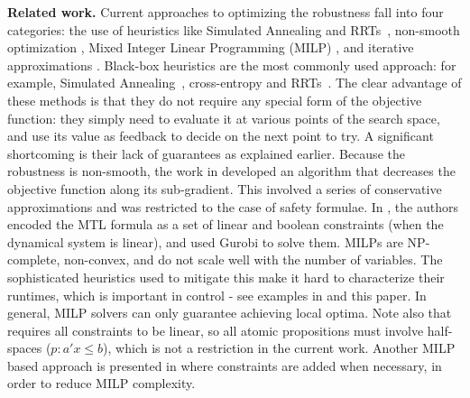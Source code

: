 \textbf{Related work.}
Current approaches to optimizing the robustness fall into four categories: 
the use of heuristics like Simulated Annealing and RRTs~\cite{NghiemSFIGP10hscc,SankaranarayananF2012hscc,Dreossi15_RRTFalsification,Deshmukh15_IterativeApproaches}, 
non-smooth optimization \cite{AbbasF13acc}, 
Mixed Integer Linear Programming (MILP) \cite{Raman14_MPCSTL,Saha_acc16}, 
and iterative approximations \cite{AbbasATVA11_LinFalsification,Abbas14_MTLDescent}.
Black-box heuristics are the most commonly used approach: for example, Simulated Annealing~\cite{NghiemSFIGP10hscc}, cross-entropy \cite{SankaranarayananF2012hscc} and RRTs~\cite{Dreossi15_RRTFalsification}.
The clear advantage of these methods is that they do not require any special form of the objective function: they simply need to evaluate it at various points of the search space, and use its value as feedback to decide on the next point to try.
A significant shortcoming is their lack of guarantees as explained earlier.
Because the robustness is non-smooth, the work in \cite{AbbasF13acc} developed an algorithm that decreases the objective function along its sub-gradient. 
This involved a series of conservative approximations and was restricted to the case of safety formulae.
In \cite{Raman14_MPCSTL}, the authors encoded the MTL formula as a set of linear and boolean constraints (when the dynamical system is linear), and used Gurobi to solve them.
MILPs are NP-complete, non-convex, and do not scale well with the number of variables. 
The sophisticated heuristics used to mitigate this make it hard to characterize their runtimes, which is important in control - see examples in \cite{Raman14_MPCSTL} and this paper. 
In general, MILP solvers can only guarantee achieving local optima.
Note also that \cite{Raman14_MPCSTL} requires all constraints to be linear, so all atomic propositions must involve half-spaces ($p: a'x\leq b$), which is not a restriction in the current work. Another MILP based approach is presented in \cite{Saha_acc16} where constraints are added when necessary, in order to reduce MILP complexity.
